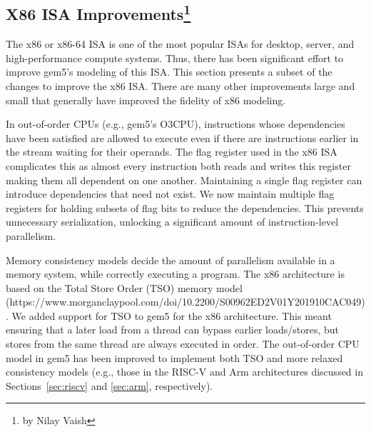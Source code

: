 \subsection[X86 ISA Improvements]{X86 ISA Improvements\footnote{by Nilay Vaish}}

The x86 or x86-64 ISA is one of the most popular ISAs for desktop, server, and high-performance compute systems.
Thus, there has been significant effort to improve gem5's modeling of this ISA.
This section presents a subset of the changes to improve the x86 ISA.
There are many other improvements large and small that generally have improved the fidelity of x86 modeling.

In out-of-order CPUs (e.g., gem5's O3CPU), instructions whose dependencies have been satisfied are allowed to execute even if there are instructions earlier in the stream waiting for their operands.
The flag register used in the x86 ISA complicates this as almost every instruction both reads and writes this register making them all dependent on one another.
Maintaining a single flag register can introduce dependencies that need not exist.
We now maintain multiple flag registers for holding subsets of flag bits to reduce the dependencies.
This prevents unnecessary serialization, unlocking a significant amount of instruction-level parallelism.

Memory consistency models decide the amount of parallelism available in a memory system, while correctly executing a program.
The x86 architecture is based on the Total Store Order (TSO) memory model~\cite{NagarajanSorin2020-cohMCMPrimer} (https://www.morganclaypool.com/doi/10.2200/S00962ED2V01Y201910CAC049).
We added support for TSO to gem5 for the x86 architecture.
This meant ensuring that a later load from a thread can bypass earlier loads/stores, but stores from the same thread are always executed in order.
The out-of-order CPU model in gem5 has been improved to implement both TSO and more relaxed consistency models (e.g., those in the RISC-V and Arm architectures discussed in Sections~\ref{sec:riscv} and \ref{sec:arm}, respectively).
